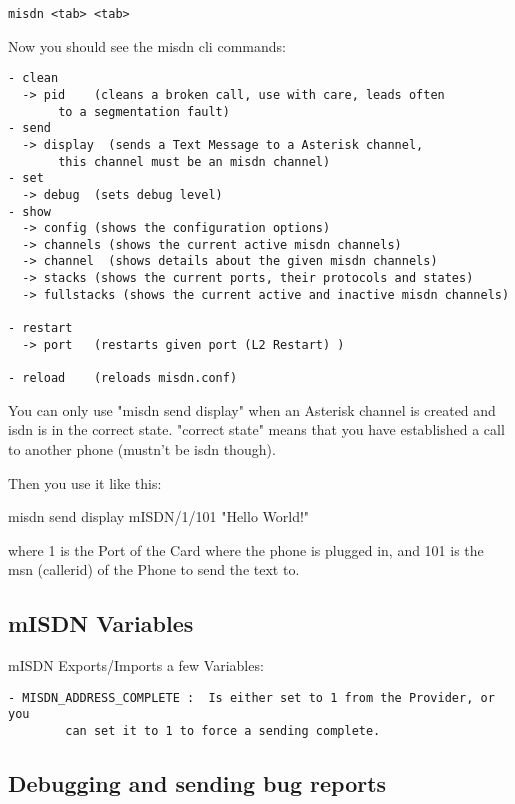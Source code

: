 \begin{verbatim}
misdn <tab> <tab>
\end{verbatim}

Now you should see the misdn cli commands:

\begin{astlisting}
\begin{verbatim}
- clean
  -> pid    (cleans a broken call, use with care, leads often
       to a segmentation fault)
- send
  -> display  (sends a Text Message to a Asterisk channel,
       this channel must be an misdn channel)
- set
  -> debug  (sets debug level)
- show
  -> config (shows the configuration options)
  -> channels (shows the current active misdn channels)
  -> channel  (shows details about the given misdn channels)
  -> stacks (shows the current ports, their protocols and states)
  -> fullstacks (shows the current active and inactive misdn channels)

- restart
  -> port   (restarts given port (L2 Restart) )

- reload    (reloads misdn.conf)
\end{verbatim}
\end{astlisting}

You can only use "misdn send display" when an Asterisk channel is created and
isdn is in the correct state. "correct state" means that you have established a
call to another phone (mustn't be isdn though).

Then you use it like this:

misdn send display mISDN/1/101 "Hello World!"

where 1 is the Port of the Card where the phone is plugged in, and 101 is the
msn (callerid) of the Phone to send the text to.

\subsection{mISDN Variables}

mISDN Exports/Imports a few Variables:

\begin{verbatim}
- MISDN_ADDRESS_COMPLETE :  Is either set to 1 from the Provider, or you
        can set it to 1 to force a sending complete.
\end{verbatim}


\subsection{Debugging and sending bug reports}

